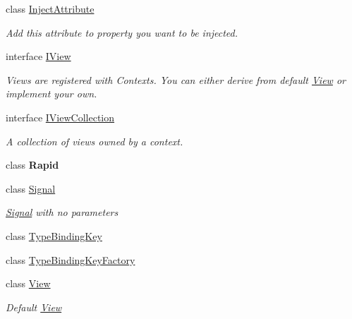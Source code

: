 \begin{DoxyCompactItemize}
\item 
class \mbox{\hyperlink{classcp_games_1_1core_1_1_rapid_m_v_c_1_1_inject_attribute}{Inject\+Attribute}}
\begin{DoxyCompactList}\small\item\em Add this attribute to property you want to be injected. \end{DoxyCompactList}\item 
interface \mbox{\hyperlink{interfacecp_games_1_1core_1_1_rapid_m_v_c_1_1_i_view}{I\+View}}
\begin{DoxyCompactList}\small\item\em Views are registered with Contexts. You can either derive from default \mbox{\hyperlink{classcp_games_1_1core_1_1_rapid_m_v_c_1_1_view}{View}} or implement your own. \end{DoxyCompactList}\item 
interface \mbox{\hyperlink{interfacecp_games_1_1core_1_1_rapid_m_v_c_1_1_i_view_collection}{I\+View\+Collection}}
\begin{DoxyCompactList}\small\item\em A collection of views owned by a context. \end{DoxyCompactList}\item 
class {\bfseries Rapid}
\item 
class \mbox{\hyperlink{classcp_games_1_1core_1_1_rapid_m_v_c_1_1_signal}{Signal}}
\begin{DoxyCompactList}\small\item\em \mbox{\hyperlink{classcp_games_1_1core_1_1_rapid_m_v_c_1_1_signal}{Signal}} with no parameters \end{DoxyCompactList}\item 
class \mbox{\hyperlink{classcp_games_1_1core_1_1_rapid_m_v_c_1_1_type_binding_key}{Type\+Binding\+Key}}
\item 
class \mbox{\hyperlink{classcp_games_1_1core_1_1_rapid_m_v_c_1_1_type_binding_key_factory}{Type\+Binding\+Key\+Factory}}
\item 
class \mbox{\hyperlink{classcp_games_1_1core_1_1_rapid_m_v_c_1_1_view}{View}}
\begin{DoxyCompactList}\small\item\em Default \mbox{\hyperlink{classcp_games_1_1core_1_1_rapid_m_v_c_1_1_view}{View}} \end{DoxyCompactList}\end{DoxyCompactItemize}
